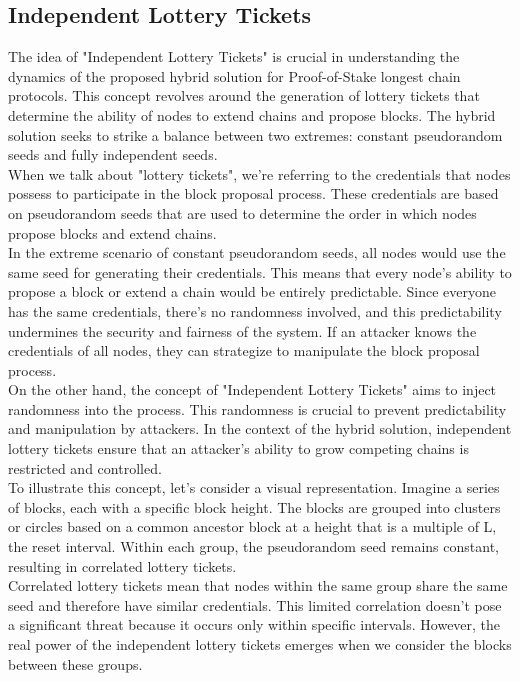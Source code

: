 \subsection{Independent Lottery Tickets}
The idea of "Independent Lottery Tickets" is crucial in understanding the dynamics of the proposed hybrid solution for Proof-of-Stake longest chain protocols. This concept revolves around the generation of lottery tickets that determine the ability of nodes to extend chains and propose blocks. The hybrid solution seeks to strike a balance between two extremes: constant pseudorandom seeds and fully independent seeds.\\
When we talk about "lottery tickets", we're referring to the credentials that nodes possess to participate in the block proposal process. These credentials are based on pseudorandom seeds that are used to determine the order in which nodes propose blocks and extend chains.\\
In the extreme scenario of constant pseudorandom seeds, all nodes would use the same seed for generating their credentials. This means that every node's ability to propose a block or extend a chain would be entirely predictable. Since everyone has the same credentials, there's no randomness involved, and this predictability undermines the security and fairness of the system. If an attacker knows the credentials of all nodes, they can strategize to manipulate the block proposal process.\\
On the other hand, the concept of "Independent Lottery Tickets" aims to inject randomness into the process. This randomness is crucial to prevent predictability and manipulation by attackers. In the context of the hybrid solution, independent lottery tickets ensure that an attacker's ability to grow competing chains is restricted and controlled.\\
To illustrate this concept, let's consider a visual representation. Imagine a series of blocks, each with a specific block height. The blocks are grouped into clusters or circles based on a common ancestor block at a height that is a multiple of L, the reset interval. Within each group, the pseudorandom seed remains constant, resulting in correlated lottery tickets.\\
Correlated lottery tickets mean that nodes within the same group share the same seed and therefore have similar credentials. This limited correlation doesn't pose a significant threat because it occurs only within specific intervals. However, the real power of the independent lottery tickets emerges when we consider the blocks between these groups.\\
